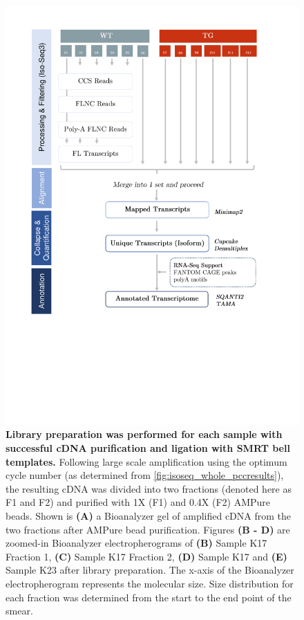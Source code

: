 \begin{figure}[!htp]
	\centering
	\vspace{20pt}
	\includegraphics[page=3,trim={1cm 12cm 0 0cm},clip,scale = 0.8]{Figures/WholeTranscriptome_Figures.pdf}
	\captionsetup{width=0.95\textwidth}
	\caption[Iso-Seq global transcript profiling - SMRTbell library preparation]%
	{\textbf{Library preparation was performed for each sample with successful cDNA purification and ligation with SMRT bell templates.} Following large scale amplification using the optimum cycle number (as determined from \cref{fig:isoseq_whole_pccresults}), the resulting cDNA was divided into two fractions (denoted here as F1 and F2) and purified with 1X (F1) and 0.4X (F2) AMPure beads. Shown is \textbf{(A)} a Bioanalyzer gel of amplified cDNA from the two fractions after AMPure bead purification. Figures \textbf{(B - D)} are zoomed-in Bioanalyzer electropherograms of \textbf{(B)} Sample K17 Fraction 1, \textbf{(C)} Sample K17 Fraction 2, \textbf{(D)} Sample K17 and \textbf{(E)} Sample K23 after library preparation. The x-axis of the Bioanalyzer electropherogram represents the molecular size. Size distribution for each fraction was determined from the start to the end point of the smear. 
}
\end{figure}
